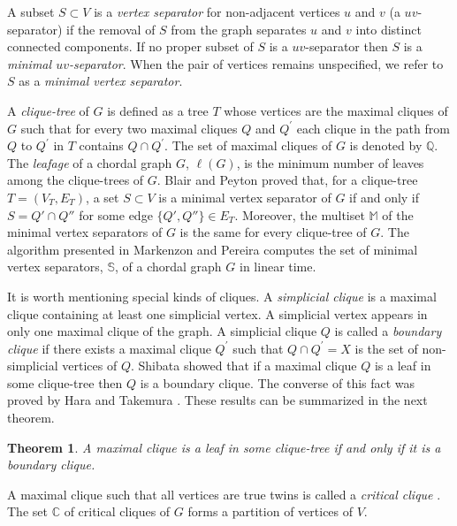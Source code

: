 \documentclass[preprint,12pt]{elsarticle}
\newtheorem{theorem}{Theorem}
\begin{document}
A subset $S \subset V$  is a \textit{vertex separator}  for
non-adjacent vertices $u$  and $v$  (a $uv$-separator) if the
removal of $S$ from the graph separates $u$ and $v$  into distinct
connected components. If no proper subset of $S$  is a
$uv$-separator then $S$ is a \textit{minimal $uv$-separator}. When the
pair of vertices remains unspecified, we refer to $S$  as a \textit{minimal vertex separator}. 


A \textit{clique-tree} of $G$ is defined as a tree $T$  whose vertices 
are the maximal cliques of $G$ such that for every  two maximal cliques $Q$ and $Q^\prime$
each clique in the path from $Q$ to $Q^\prime$ in $T$ contains $Q\cap Q^\prime$. 
The set of maximal cliques of $G$ is denoted by $\mathbb{Q}$.
The \textit{leafage} of a chordal graph $G$, $\ell(G)$,  is the minimum number of leaves among
the clique-trees of $G$.
Blair and Peyton \cite{BP93}   proved that, 
for a clique-tree $T=(V_T, E_T)$,
a set $S\subset V$ is a minimal vertex separator of $G$ if
and only if $S= Q' \cap Q''$ for some edge $\{Q', Q''\}\in E_T$.
Moreover, the multiset  ${\mathbb M}$ of
the minimal vertex separators of $G$ is the same for every
clique-tree of $G$.
The algorithm presented in Markenzon and Pereira \cite{MP10} computes  
the set of minimal vertex separators, $\mathbb S$, of a chordal graph $G$ in linear time.


It is worth mentioning special kinds of cliques.
A \textit{simplicial clique} is a maximal clique containing at least one simplicial vertex.
A simplicial vertex appears in only one maximal clique of the graph.
A simplicial clique $Q$ is called a \textit{boundary clique} if there exists a maximal clique $Q^\prime$
such that  $Q \cap Q^\prime=X $ is the set of non-simplicial vertices of $Q$. 
Shibata \cite{S88} showed that if a maximal clique $Q$ is a leaf in some clique-tree 
then $Q$ is a boundary clique.
The converse of this fact was proved by
Hara and Takemura \cite{HT06}.
These results can be summarized in the next theorem.

\begin{theorem}\label{theo:leaf-boundary} {\rm\cite{HT06}}
A maximal clique is a leaf in some clique-tree if and only if it is a boundary clique.
\end{theorem}
A maximal clique such that all vertices are true twins is called 
a \textit{critical clique} \cite{LKJ02}. 
The set $\mathbb{C}$ of critical cliques of $G$  forms a partition of vertices of $V$.
\end{document}
